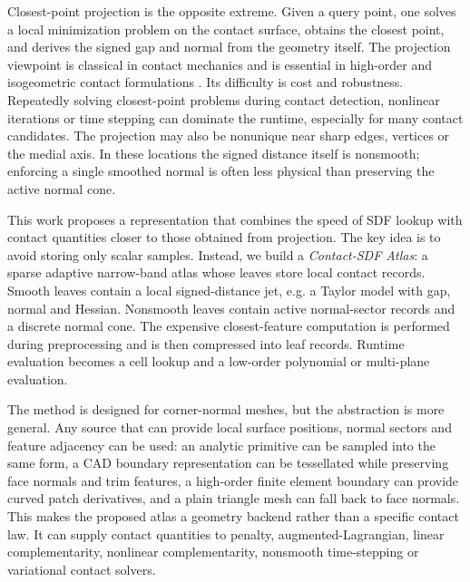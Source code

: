 \documentclass[preprint,12pt,sort&compress]{elsarticle}
\begin{document}
Closest-point projection is the opposite extreme. Given a query point, one solves a local minimization problem on the contact surface, obtains the closest point, and derives the signed gap and normal from the geometry itself. The projection viewpoint is classical in contact mechanics and is essential in high-order and isogeometric contact formulations \cite{Konyukhov2008,Lu2011,Temizer2011}. Its difficulty is cost and robustness. Repeatedly solving closest-point problems during contact detection, nonlinear iterations or time stepping can dominate the runtime, especially for many contact candidates. The projection may also be nonunique near sharp edges, vertices or the medial axis. In these locations the signed distance itself is nonsmooth; enforcing a single smoothed normal is often less physical than preserving the active normal cone.

This work proposes a representation that combines the speed of SDF lookup with contact quantities closer to those obtained from projection. The key idea is to avoid storing only scalar samples. Instead, we build a \emph{Contact-SDF Atlas}: a sparse adaptive narrow-band atlas whose leaves store local contact records. Smooth leaves contain a local signed-distance jet, e.g. a Taylor model with gap, normal and Hessian. Nonsmooth leaves contain active normal-sector records and a discrete normal cone. The expensive closest-feature computation is performed during preprocessing and is then compressed into leaf records. Runtime evaluation becomes a cell lookup and a low-order polynomial or multi-plane evaluation.

The method is designed for corner-normal meshes, but the abstraction is more general. Any source that can provide local surface positions, normal sectors and feature adjacency can be used: an analytic primitive can be sampled into the same form, a CAD boundary representation can be tessellated while preserving face normals and trim features, a high-order finite element boundary can provide curved patch derivatives, and a plain triangle mesh can fall back to face normals. This makes the proposed atlas a geometry backend rather than a specific contact law. It can supply contact quantities to penalty, augmented-Lagrangian, linear complementarity, nonlinear complementarity, nonsmooth time-stepping or variational contact solvers.
\end{document}
